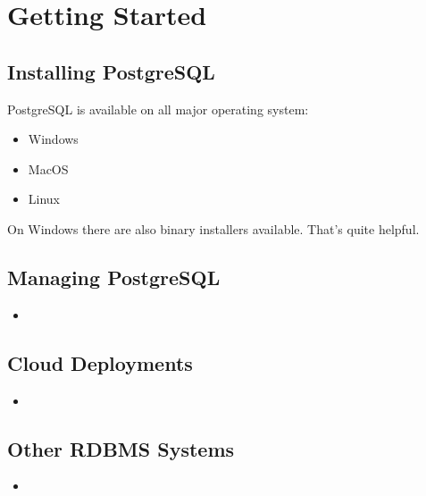 %
%
%
\section{Getting Started}

\subsection{Installing PostgreSQL}
PostgreSQL is available on all major operating system:

\begin{itemize}
    \item Windows
    \item MacOS
    \item Linux
\end{itemize}

On Windows there are also binary installers available. That's quite helpful. 

\subsection{Managing PostgreSQL}

\begin{itemize}
    \item 
\end{itemize}


\subsection{Cloud Deployments}

\begin{itemize}
    \item 
\end{itemize}

\subsection{Other RDBMS Systems}

\begin{itemize}
    \item 
\end{itemize}
